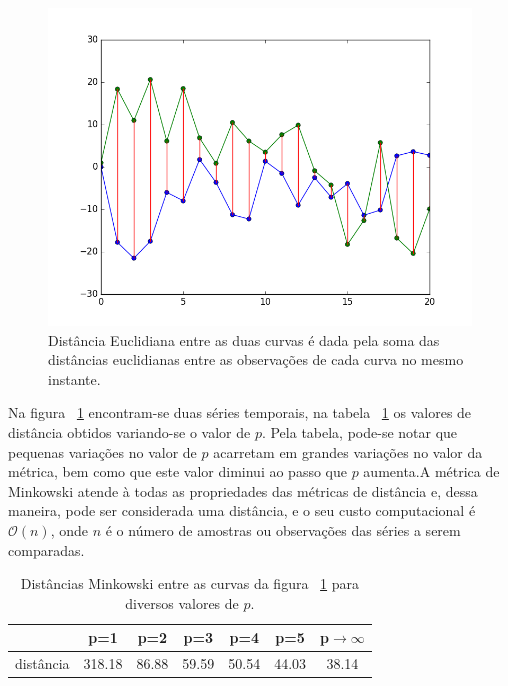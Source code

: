 \begin{figure}[h!]
	  \includegraphics[width=\linewidth]{figuras/dist_euclidiana.png}
	  \caption{Distância Euclidiana entre as duas curvas é dada pela soma das distâncias euclidianas entre as observações de cada curva no mesmo instante.}
	  \label{fig:dist_euclidiana}
\end{figure}

Na figura ~\ref{fig:dist_euclidiana} encontram-se duas séries temporais, na tabela ~\ref{minkowski_table} os valores de distância obtidos variando-se o valor de $p$. Pela tabela, pode-se notar que pequenas variações no valor de $p$ acarretam em grandes variações no valor da métrica, bem como que este valor diminui ao passo que $p$ aumenta.A métrica de Minkowski atende à todas as propriedades das métricas de distância e, dessa maneira, pode ser considerada uma distância, e o seu custo computacional é $\mathcal{O}(n)$, onde $n$ é o número de amostras ou observações das séries a serem comparadas.


\begin{table}[]
	\centering
	\caption{Distâncias Minkowski entre as curvas da figura ~\ref{fig:dist_euclidiana} para diversos valores de $p$.}
	\label{minkowski_table}
	\begin{tabular}{|c|c|c|c|c|c|c|}
		\hline
						& p=1    & p=2   & p=3   & p=4 &p=5 & p$\to \infty$ \\ \hline
		distância & 318.18 & 86.88 & 59.59 & 50.54 & 44.03 & 38.14   \\ \hline
	\end{tabular}
\end{table}


